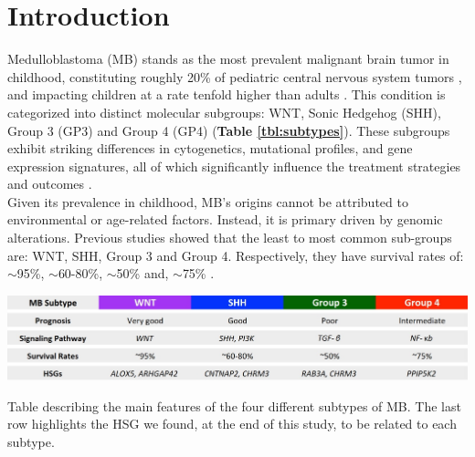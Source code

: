 \documentclass[10pt]{SelfArx} %
\affiliation{\textsuperscript{1}\textit{University of Trento, Trento 38123, Italy}} %
\begin{document}
\maketitle %



\section*{Introduction}\label{sec:introduction}
Medulloblastoma (MB) stands as the most prevalent malignant brain tumor in childhood, constituting roughly 20\% of pediatric central nervous system tumors \cite{kumar2017challenges}, and impacting children at a rate tenfold higher than adults \cite{carta2020cancer}. This condition is categorized into distinct molecular subgroups: WNT, Sonic Hedgehog (SHH), Group 3 (GP3) and Group 4 (GP4) (\textbf{Table \ref{tbl:subtypes}}). These subgroups exhibit striking differences in cytogenetics, mutational profiles, and gene expression signatures, all of which significantly influence the treatment strategies and outcomes \cite{chen2022molecular}.\\
Given its prevalence in childhood, MB's origins cannot be attributed to environmental or age-related factors. Instead, it is primary driven by genomic alterations.
Previous studies showed that the least to most common sub-groups are: WNT, SHH, Group 3 and Group 4. Respectively, they have survival rates of: $\sim$95\%, $\sim$60-80\%, $\sim$50\% and, $\sim$75\% \cite{northcott2012medulloblastomics, hovestadt2020medulloblastomics}. 

\begin{table}[h!]
  \centering
    \includegraphics[width=1\textwidth]{project-report/figures/subtypes.jpeg}
    \caption{Table describing the main features of the four different subtypes of MB. The last row highlights the HSG we found, at the end of this study, to be related to each subtype.}
   \label{tbl:subtypes}
\end{table}
\end{document}
